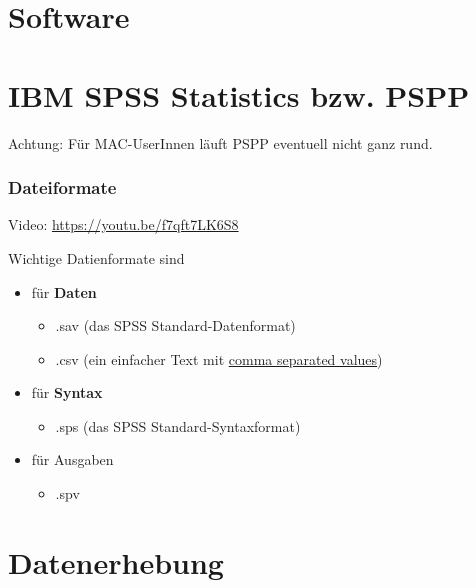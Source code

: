 \documentclass[
]{book}
\providecommand{\tightlist}{%
  \setlength{\itemsep}{0pt}\setlength{\parskip}{0pt}}
\begin{document}
\hypertarget{software}{%
\chapter{Software}\label{software}}

\hypertarget{ibm-spss-statistics-bzw.-pspp}{%
\chapter{IBM SPSS Statistics bzw. PSPP}\label{ibm-spss-statistics-bzw.-pspp}}

Achtung: Für MAC-UserInnen läuft PSPP eventuell nicht ganz rund.

\hypertarget{dateiformate}{%
\subsection{Dateiformate}\label{dateiformate}}

Video: \url{https://youtu.be/f7qft7LK6S8}

Wichtige Datienformate sind

\begin{itemize}
\tightlist
\item
  für \textbf{Daten}

  \begin{itemize}
  \tightlist
  \item
    .sav (das SPSS Standard-Datenformat)
  \item
    .csv (ein einfacher Text mit \href{https://en.wikipedia.org/wiki/Comma-separated_values}{comma separated values})
  \end{itemize}
\item
  für \textbf{Syntax}

  \begin{itemize}
  \tightlist
  \item
    .sps (das SPSS Standard-Syntaxformat)
  \end{itemize}
\item
  für Ausgaben

  \begin{itemize}
  \tightlist
  \item
    .spv
  \end{itemize}
\end{itemize}

\hypertarget{datenerhebung-1}{%
\chapter{Datenerhebung}\label{datenerhebung-1}}
\end{document}
